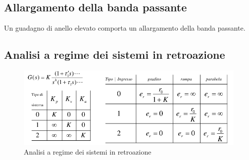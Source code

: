 \subsection{Allargamento della banda passante}

Un guadagno di anello elevato comporta un allargamento della banda passante.

\subsection{Analisi a regime dei sistemi in retroazione}

\begin{figure}[h!]
  \centering
  \includegraphics[width=0.5\linewidth]{./images/analisi_regime_retroazione.png}
  \caption{Analisi a regime dei sistemi in retroazione}
  \label{fig:analisi_regime_retroazione}
\end{figure}



